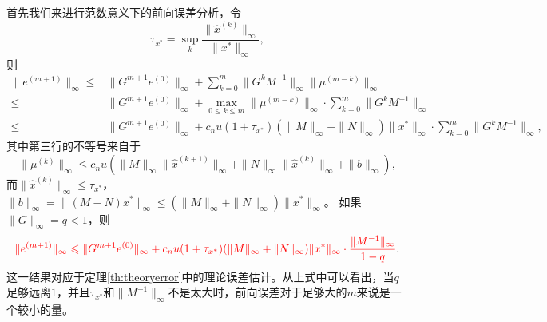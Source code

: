 \documentclass[a4paper,10pt]{ctexart}
\begin{document}
首先我们来进行范数意义下的前向误差分析，令
\[
    \tau_{x^*} = \sup_k \frac{\| \hat{x}^{(k)} \|_\infty}{\| x^* \|_\infty},
\]
则
\[
    \begin{aligned}
        \| e^{(m+1)} \|_\infty \leqslant & \| G^{m+1} e^{(0)} \|_\infty + \sum_{k=0}^m \| G^k M^{-1} \|_\infty \| \mu^{(m-k)} \|_\infty\\
        \leqslant &\| G^{m+1} e^{(0)} \|_\infty + \max_{0\leqslant k\leqslant m} \| \mu^{(m-k)} \|_\infty\cdot\sum_{k=0}^m \| G^k M^{-1} \|_\infty \\
        \leqslant &\| G^{m+1} e^{(0)} \|_\infty + c_n u (1+\tau_{x^*})(\| M \|_\infty + \| N \|_\infty)\| x^* \|_\infty \cdot \sum_{k=0}^m \| G^kM^{-1} \|_\infty,
    \end{aligned}
\]
其中第三行的不等号来自于
\[
    \| \mu^{(k)} \|_\infty \leqslant c_n u(\| M \|_\infty \| \hat{x}^{(k+1)} \|_\infty + \| N \|_\infty \| \hat{x}^{(k)} \|_\infty + \| b \|_\infty),
\]
而$ \| \hat{x}^{(k)} \|_\infty \leqslant \tau_{x^*} $，$ \| b \|_\infty = \| (M-N)x^* \|_\infty \leqslant (\| M \|_\infty + \| N \|_\infty)\| x^* \|_\infty $。
如果$ \| G \|_\infty = q<1 $，则
\begin{equation}
    \textcolor{red}{\| e^{(m+1)} \|_\infty \leqslant \| G^{m+1} e^{(0)} \|_\infty + c_n u (1+\tau_{x^*})(\| M \|_\infty + \| N \|_\infty)\| x^* \|_\infty \cdot \frac{\| M^{-1} \|_\infty}{1-q}}.
\end{equation}
这一结果对应于定理\ref{th:theoryerror}中的理论误差估计。从上式中可以看出，当$ q $足够远离$ 1 $，并且$ \tau_{x^*} $和$ \| M^{-1} \|_\infty $不是太大时，前向误差对于足够大的$ m $来说是一个较小的量。
\end{document}
